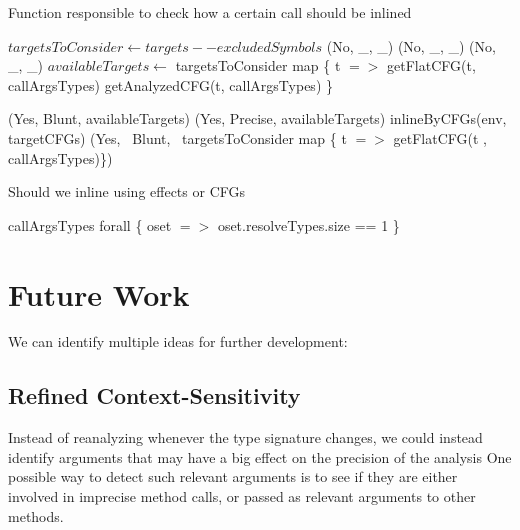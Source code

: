 \documentclass[a4paper]{article}
\begin{document}
\begin{algorithm}
\caption{Function responsible to check how a certain call should be
inlined}\label{algo:pt:shouldwe}
\begin{algorithmic}[1]
    \State $targetsToConsider \gets targets -- excludedSymbols$
            \State \Return (No, \_, \_)
            \State \Return (No, \_, \_)
            \State \Return (No, \_, \_)
        \Else
            \State $availableTargets \gets$ targetsToConsider map \{ t $=>$
                \State getFlatCFG(t, callArgsTypes)
            \Else
                \State getAnalyzedCFG(t, callArgsTypes)
            \EndIf
            \State \}

                \State \Return (Yes, Blunt, availableTargets)
            \Else
                \State \Return (Yes, Precise, availableTargets)
            \EndIf
        \EndIf
        \State \Return inlineByCFGs(env, targetCFGs)
    \Else
        \State \Return (Yes, ~Blunt, ~targetsToConsider map \{ t $=>$ getFlatCFG(t , callArgsTypes)\})
    \EndIf
\EndFunction
\end{algorithmic}
\end{algorithm}

\begin{algorithm}
\caption{Should we inline using effects or CFGs}\label{algo:pt:shouldwe}
\begin{algorithmic}[1]
    \State \Return callArgsTypes forall \{ oset $=>$ oset.resolveTypes.size == 1 \}
\EndFunction
\end{algorithmic}
\end{algorithm}

\section{Future Work}
We can identify multiple ideas for further development:

\subsection{Refined Context-Sensitivity}
Instead of reanalyzing whenever the type signature changes, we could instead
identify arguments that may have a big effect on the precision of the analysis
One possible way to detect such relevant arguments is to see if they are either
involved in imprecise method calls, or passed as relevant arguments to other
methods.
\end{document}
